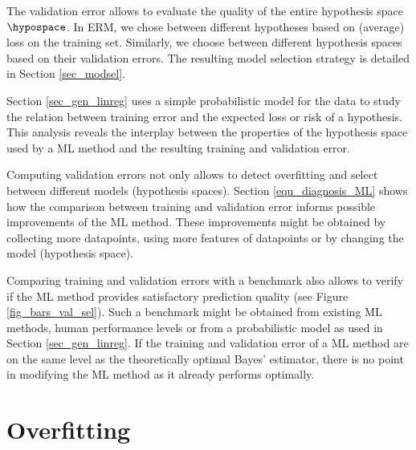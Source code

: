 \documentclass[12pt]{report}
\begin{document}
The validation error allows to evaluate the quality of the entire hypothesis 
space $\hypospace$. In ERM, we chose between different 
hypotheses based on (average) loss on the training set. Similarly, we 
choose between different hypothesis spaces based on their validation errors. 
The resulting model selection strategy is detailed in Section \ref{sec_modsel}. 

Section \ref{sec_gen_linreg} uses a simple probabilistic model for the 
data to study the relation between training error and the expected loss 
or risk of a hypothesis. This analysis reveals the interplay between the 
properties of the hypothesis space used by a ML method and the resulting 
training and validation error.

Computing validation errors not only allows to detect overfitting and 
select between different models (hypothesis spaces). Section \ref{equ_diagnosis_ML} 
shows how the comparison between training and validation error informs 
possible improvements of the ML method. These improvements might be 
obtained by collecting more datapoints, using more features of datapoints 
or by changing the model (hypothesis space). 

Comparing training and validation errors with a benchmark also allows to 
verify if the ML method provides satisfactory prediction quality (see Figure \ref{fig_bars_val_sel}). 
Such a benchmark might be obtained from existing ML methods, human performance 
levels or from a probabilistic model as used in Section \ref{sec_gen_linreg}. If the 
training and validation error of a ML method are on the same level as the theoretically 
optimal Bayes' estimator, there is no point in modifying the ML method as it 
already performs optimally. 







\section{Overfitting}
\label{sec_overfitting_sec_6}
\end{document}
